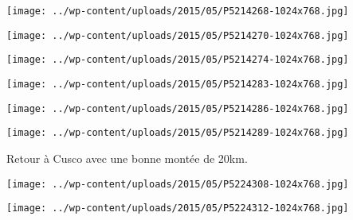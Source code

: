  

 

\begin{center} \texttt{[image: ../wp-content/uploads/2015/05/P5214268-1024x768.jpg]} \end{center}

 

 

\begin{center} \texttt{[image: ../wp-content/uploads/2015/05/P5214270-1024x768.jpg]} \end{center}

 

 

\begin{center} \texttt{[image: ../wp-content/uploads/2015/05/P5214274-1024x768.jpg]} \end{center}

 

 

\begin{center} \texttt{[image: ../wp-content/uploads/2015/05/P5214283-1024x768.jpg]} \end{center}

 

 

\begin{center} \texttt{[image: ../wp-content/uploads/2015/05/P5214286-1024x768.jpg]} \end{center}

 

 

\begin{center} \texttt{[image: ../wp-content/uploads/2015/05/P5214289-1024x768.jpg]} \end{center}

 

 Retour à Cusco avec une bonne montée de 20km. 

 

\begin{center} \texttt{[image: ../wp-content/uploads/2015/05/P5224308-1024x768.jpg]} \end{center}

 

 

\begin{center} \texttt{[image: ../wp-content/uploads/2015/05/P5224312-1024x768.jpg]} \end{center}

